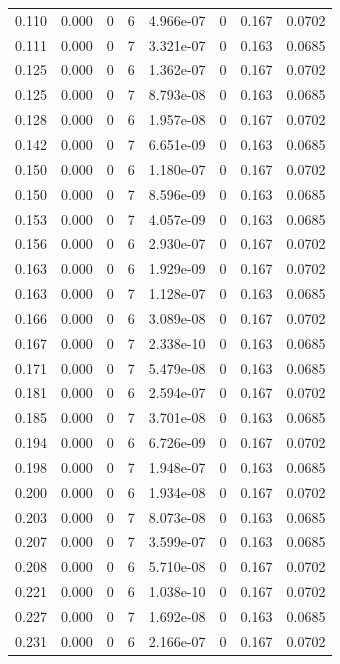 \documentclass[preview]{standalone}
\begin{document}
{{\begin{tabular}{L{1.2cm}C{1.2cm} C{0.3cm}C{0.5cm} C{1.4cm}C{1.4cm} C{1.4cm}C{1.4cm}}
  0.110  &  0.000  & 0     &  6 &  4.966e-07  & 0  & 0.167 &  0.0702   \\ 
  0.111  &  0.000  & 0     &  7 &  3.321e-07  & 0  & 0.163 &  0.0685   \\ 
  0.125  &  0.000  & 0     &  6 &  1.362e-07  & 0  & 0.167 &  0.0702   \\ 
  0.125  &  0.000  & 0     &  7 &  8.793e-08  & 0  & 0.163 &  0.0685   \\ 
  0.128  &  0.000  & 0     &  6 &  1.957e-08  & 0  & 0.167 &  0.0702   \\ 
  0.142  &  0.000  & 0     &  7 &  6.651e-09  & 0  & 0.163 &  0.0685   \\ 
  0.150  &  0.000  & 0     &  6 &  1.180e-07  & 0  & 0.167 &  0.0702   \\ 
  0.150  &  0.000  & 0     &  7 &  8.596e-09  & 0  & 0.163 &  0.0685   \\ 
  0.153  &  0.000  & 0     &  7 &  4.057e-09  & 0  & 0.163 &  0.0685   \\ 
  0.156  &  0.000  & 0     &  6 &  2.930e-07  & 0  & 0.167 &  0.0702   \\ 
  0.163  &  0.000  & 0     &  6 &  1.929e-09  & 0  & 0.167 &  0.0702   \\ 
  0.163  &  0.000  & 0     &  7 &  1.128e-07  & 0  & 0.163 &  0.0685   \\ 
  0.166  &  0.000  & 0     &  6 &  3.089e-08  & 0  & 0.167 &  0.0702   \\ 
  0.167  &  0.000  & 0     &  7 &  2.338e-10  & 0  & 0.163 &  0.0685   \\ 
  0.171  &  0.000  & 0     &  7 &  5.479e-08  & 0  & 0.163 &  0.0685   \\ 
  0.181  &  0.000  & 0     &  6 &  2.594e-07  & 0  & 0.167 &  0.0702   \\ 
  0.185  &  0.000  & 0     &  7 &  3.701e-08  & 0  & 0.163 &  0.0685   \\ 
  0.194  &  0.000  & 0     &  6 &  6.726e-09  & 0  & 0.167 &  0.0702   \\ 
  0.198  &  0.000  & 0     &  7 &  1.948e-07  & 0  & 0.163 &  0.0685   \\ 
  0.200  &  0.000  & 0     &  6 &  1.934e-08  & 0  & 0.167 &  0.0702   \\ 
  0.203  &  0.000  & 0     &  7 &  8.073e-08  & 0  & 0.163 &  0.0685   \\ 
  0.207  &  0.000  & 0     &  7 &  3.599e-07  & 0  & 0.163 &  0.0685   \\ 
  0.208  &  0.000  & 0     &  6 &  5.710e-08  & 0  & 0.167 &  0.0702   \\ 
  0.221  &  0.000  & 0     &  6 &  1.038e-10  & 0  & 0.167 &  0.0702   \\ 
  0.227  &  0.000  & 0     &  7 &  1.692e-08  & 0  & 0.163 &  0.0685   \\ 
  0.231  &  0.000  & 0     &  6 &  2.166e-07  & 0  & 0.167 &  0.0702   \\ 
\hline 
\end{tabular} 

}}
\end{document}
